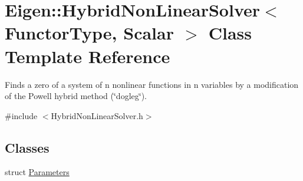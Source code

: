 \hypertarget{class_eigen_1_1_hybrid_non_linear_solver}{}\section{Eigen\+:\+:Hybrid\+Non\+Linear\+Solver$<$ Functor\+Type, Scalar $>$ Class Template Reference}
\label{class_eigen_1_1_hybrid_non_linear_solver}


Finds a zero of a system of n nonlinear functions in n variables by a modification of the Powell hybrid method (\char`\"{}dogleg\char`\"{}).  




{\ttfamily \#include $<$Hybrid\+Non\+Linear\+Solver.\+h$>$}

\subsection*{Classes}
\begin{DoxyCompactItemize}
\item 
struct \hyperlink{struct_eigen_1_1_hybrid_non_linear_solver_1_1_parameters}{Parameters}
\end{DoxyCompactItemize}
